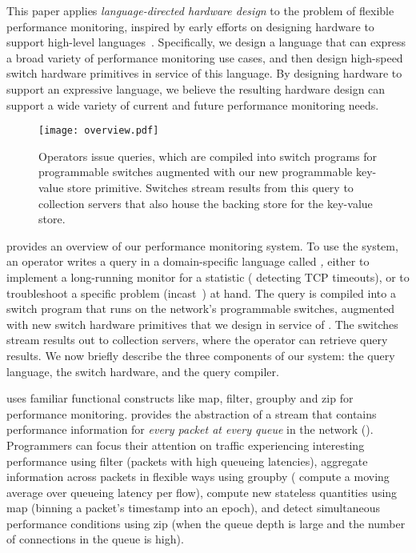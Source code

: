 This paper applies {\em language-directed hardware design} to the problem of
flexible performance monitoring, inspired by early efforts on designing
hardware to support high-level
languages~\cite{language-directed-computer-design, ditzel_patterson, soar}.
Specifically, we design a language that can express a broad variety of
performance monitoring use cases, and then design high-speed switch hardware
primitives in service of this language. By designing hardware to support an
expressive language, we believe the resulting hardware design can support a
wide variety of current and future performance monitoring needs.

\begin{figure}[!t]
\texttt{[image: overview.pdf]}
\caption{Operators issue \TheSystem queries, which are compiled into switch
programs for programmable switches augmented with our new programmable
key-value store primitive. Switches stream results from this query to
collection servers that also house the backing store for the key-value store.}
\label{fig:overview}
\end{figure}

 provides an overview of our performance monitoring system. To
use the system, an operator writes a query in a domain-specific language called
{\em \TheSystem,} either to implement a long-running monitor for a statistic (\eg
detecting TCP timeouts), or to troubleshoot a specific problem (\eg incast~\cite{tcpincast}) at hand. The
query is compiled into a switch program that runs on the network's programmable
switches, augmented with new switch hardware primitives that we design in
service of \TheSystem.  The switches stream results out to collection servers,
where the operator can retrieve query results. We now briefly describe the
three components of our system: the query language, the switch hardware, and
the query compiler.

 \TheSystem uses familiar functional
constructs like {\ct map}, {\ct filter}, {\ct groupby} and {\ct zip} for
performance monitoring.
\TheSystem provides the abstraction of a stream that contains performance
information for {\em every packet at every queue} in the network
().
%
Programmers can focus their attention on traffic experiencing interesting
performance using {\ct filter} (\eg packets with high queueing latencies),
aggregate information across packets in flexible ways using {\ct groupby} (\eg
compute a moving average over queueing latency per flow), compute new stateless
quantities using {\ct map} (\eg binning a packet's timestamp into an epoch), and
detect simultaneous performance conditions using {\ct zip} (\eg when the queue
depth is large and the number of connections in the queue is high).

